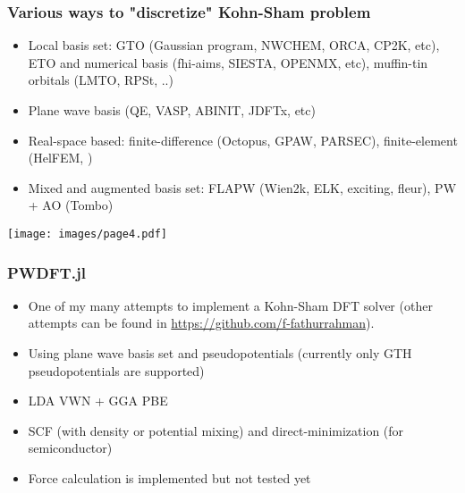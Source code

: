 \documentclass[english,9pt]{beamer}
\begin{document}
\begin{frame}
\frametitle{Various ways to "discretize" Kohn-Sham problem}

\begin{itemize}
\item Local basis set: GTO (Gaussian program, NWCHEM, ORCA, CP2K, etc),
  ETO and numerical basis (fhi-aims, SIESTA, OPENMX, etc),
  muffin-tin orbitals (LMTO, RPSt, ..)
\item Plane wave basis (QE, VASP, ABINIT, JDFTx, etc)
\item Real-space based: finite-difference (Octopus, GPAW, PARSEC), finite-element (HelFEM, )
\item Mixed and augmented basis set: FLAPW (Wien2k, ELK, exciting, fleur),
  PW + AO (Tombo)
\end{itemize}

\end{frame}


\begin{frame}[plain]

\texttt{[image: images/page4.pdf]}

\end{frame}


\begin{frame}
\frametitle{PWDFT.jl}

\begin{itemize}
\item One of my many attempts to implement a Kohn-Sham DFT solver
(other attempts can be found in 
{\footnotesize\url{https://github.com/f-fathurrahman}}).
\item Using plane wave basis set and pseudopotentials (currently only GTH pseudopotentials
are supported)
\item LDA VWN + GGA PBE
\item SCF (with density or potential mixing) and direct-minimization (for semiconductor)
\item Force calculation is implemented but not tested yet
\end{itemize}

\end{frame}
\end{document}
